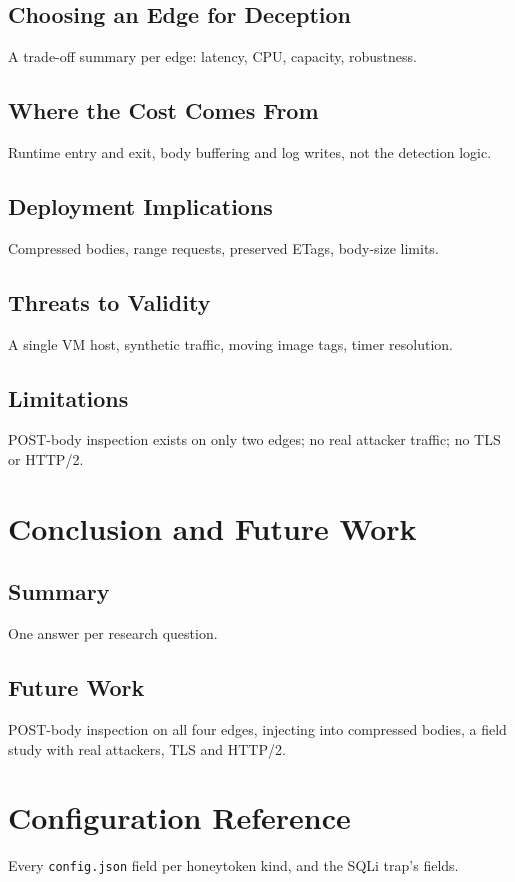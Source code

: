 \documentclass{rptuma}
\begin{document}
\section{Choosing an Edge for Deception}
A trade-off summary per edge: latency, CPU, capacity, robustness.

\section{Where the Cost Comes From}
Runtime entry and exit, body buffering and log writes, not the detection logic.

\section{Deployment Implications}
Compressed bodies, range requests, preserved ETags, body-size limits.

\section{Threats to Validity}
A single VM host, synthetic traffic, moving image tags, timer resolution.

\section{Limitations}
POST-body inspection exists on only two edges; no real attacker traffic; no TLS or HTTP/2.

\chapter{Conclusion and Future Work}
\section{Summary}
One answer per research question.
\section{Future Work}
POST-body inspection on all four edges, injecting into compressed bodies, a field study with real
attackers, TLS and HTTP/2.

\appendix
\chapter{Configuration Reference}
Every \texttt{config.json} field per honeytoken kind, and the SQLi trap's fields.
\end{document}
